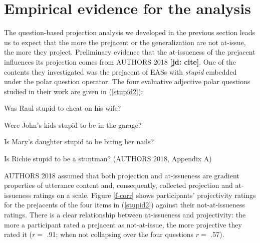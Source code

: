 \documentclass[11pt,fleqn]{article}
\newcommand{\6}{\mbox{$[\hspace*{-.6mm}[$}}
\newcommand{\9}{\mbox{$]\hspace*{-.6mm}]$}}
\newcommand{\jd}[1]{\textbf{\color{red}[jd: #1]}}
\begin{document}
\section{Empirical evidence for the analysis}\label{s3}

The question-based projection analysis we developed in the previous section leads us to expect that the more the prejacent or the generalization are not at-issue, the more they project. Preliminary evidence that the at-issueness of the prejacent influences its projection comes from AUTHORS 2018 \jd{cite}. One of the contents they investigated was the prejacent of EASs with {\em stupid} embedded under the polar question operator. The four evaluative adjective polar questions studied in their work are given in (\ref{stupid2}):

\begin{exe}
\ex\label{stupid2}

\begin{xlist}

\ex Was Raul stupid to cheat on his wife?

\ex Were John's kids stupid to be in the garage?

\ex Is Mary's daughter stupid to be biting her nails?

\ex Is Richie stupid to be a stuntman? \hfill (AUTHORS 2018, Appendix A)

\end{xlist}

\end{exe}
AUTHORS 2018 assumed that both projection and at-issueness are gradient properties of utterance content and, consequently, collected projection and at-issueness ratings on a scale. Figure \ref{f-corr} shows participants' projectivity ratings for the prejacents of the four items in (\ref{stupid2}) against their not-at-issueness ratings. There is a clear relationship between at-issueness and projectivity: the more a participant rated a prejacent as not-at-issue, the more projective they rated it ($r =$ .91; when not collapsing over the four questions $r =$ .57). 
\end{document}
